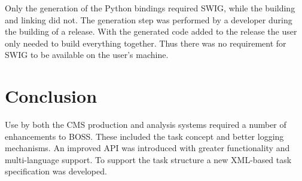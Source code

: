 
Only the generation of the Python bindings required SWIG, while the building and linking did not. The generation step was performed by a developer during the building of a release. With the generated code added to the release the user only needed to build everything together. Thus there was no requirement for SWIG to be available on the user's machine. 



%
%
%

\section{Conclusion}
Use by both the CMS production and analysis systems required a number of enhancements to BOSS. These included the task concept and better logging mechanisms. An improved API was introduced with greater functionality and multi-language support. To support the task structure a new XML-based task specification was developed. 
